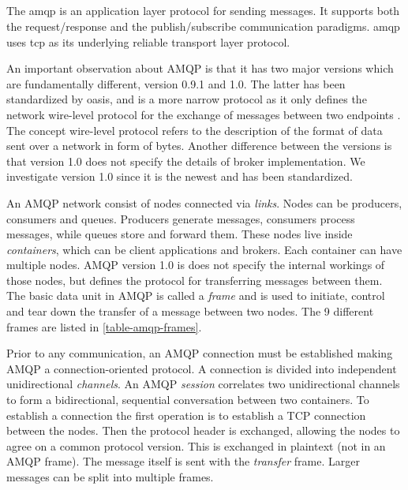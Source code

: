\subsection{}

The \gls{amqp} is an application layer protocol for sending messages.
It supports both the request/response and the publish/subscribe communication
paradigms. \gls{amqp} uses \gls{tcp} as its underlying reliable transport layer
protocol.

An important observation about AMQP is that it has two major versions which are
fundamentally different, version 0.9.1 and 1.0. The latter has been standardized
by \gls{oasis}, and is a  more narrow protocol as it only defines the network
wire-level protocol for the exchange of messages between two endpoints
\cite{oasis-amqp}. The concept wire-level protocol refers to the description of the format
of data sent over a network in form of bytes. Another difference between the
versions is that version 1.0 does not specify the details of broker
implementation. We investigate version 1.0 since it is the newest and has been
standardized.

An AMQP network consist of nodes connected via \textit{links}. Nodes can be
producers, consumers and queues. Producers generate messages, consumers process
messages, while queues store and forward them. These nodes live inside
\textit{containers}, which can be client applications and brokers. Each
container can have multiple nodes. AMQP version 1.0 is does not specify the
internal workings of those nodes, but defines the protocol for transferring
messages between them. The basic data unit in AMQP is called a \textit{frame}
and is used to initiate, control and tear down the transfer of a message between
two nodes. The 9 different frames are listed in \cref{table-amqp-frames}.

Prior to any communication, an AMQP connection must be established making AMQP a
connection-oriented protocol. A connection is divided into independent
unidirectional \textit{channels}. An AMQP \textit{session} correlates two
unidirectional channels to form a bidirectional, sequential conversation between
two containers. To establish a connection the first operation is to establish a
TCP connection between the nodes. Then the protocol header is exchanged,
allowing the nodes to agree on a common protocol version. This is exchanged in
plaintext (not in an AMQP frame). The message itself is sent with the
\textit{transfer} frame. Larger messages can be split into multiple frames.


